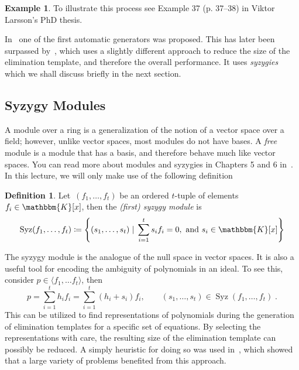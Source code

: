 \documentclass[11pt,a4paper]{article}
\theoremstyle{definition}
\newtheorem{example}{Example}
\newtheorem{definition}{Definition}
\newcommand{\te}[1]{\text{#1}}
\newcommand{\K}{\ensuremath{\mathbbm{K}}}
\DeclareMathOperator{\syz}{Syz}
\begin{document}

\begin{example}
To illustrate this process see Example 37 (p. 37--38) in Viktor Larsson's PhD thesis.
\end{example}



In~\cite{kukelova2008} one of the first automatic generators was proposed.
This has later been surpassed by~\cite{larsson2017cvpr}, which uses a slightly
different approach to reduce the size of the elimination template, and therefore the overall
performance. It uses \emph{syzygies} which we shall discuss briefly in the next section.

\subsection{Syzygy Modules}
A module over a ring is a generalization of the notion of a vector space over a field; however,
unlike vector spaces, most modules do not have bases.
A \emph{free} module is a module that has a basis, and therefore behave much like vector spaces.
You can read more about modules and syzygies in Chapters 5 and 6 in~\cite{cox2}.
In this lecture, we will only make use of the following definition
\begin{definition}
Let~$(f_1,\ldots,f_t)$ be an ordered $t$-tuple of elements
$f_i\in\K[x]$, then the \emph{(first) syzygy module} is
\begin{equation}
\syz(f_1,\ldots,f_t) \coloneqq \left\{
    (s_1,\ldots,s_t)\;|\; \sum_{i=1}^t s_if_i=0, \te{ and } s_i\in\K[x]
\right\}
\end{equation}
\end{definition}
The syzygy module is the analogue of the null space in vector spaces. It is also a useful tool
for encoding the ambiguity of polynomials in an ideal. To see this, consider
$p\in \langle f_1,\ldots f_t\rangle$, then
\begin{equation}
    p = \sum_{i=1}^t h_if_i = \sum_{i=1}^t (h_i+s_i)f_i, \qquad (s_1,\ldots,s_t)\in\syz(f_1,\ldots,f_t)\;.
\end{equation}
This can be utilized to find representations of polynomials during the generation of elimination
templates for a specific set of equations. By selecting the representations with care,
the resulting size of the elimination template can possibly be reduced. A simply heuristic for
doing so was used in~\cite{larsson2017cvpr}, which showed that a large variety of problems benefited
from this approach.
\end{document}
